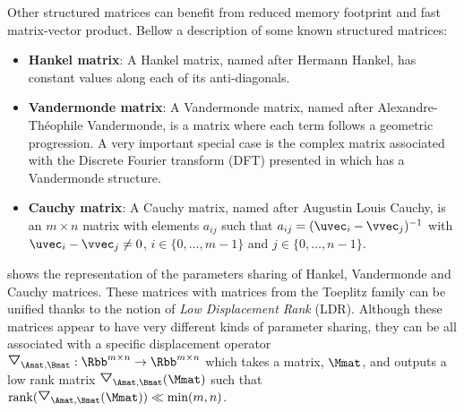 Other structured matrices can benefit from reduced memory footprint and fast matrix-vector product.
Bellow a description of some known structured matrices: 
\begin{itemize}
  \item \textbf{Hankel matrix}: A Hankel matrix, named after Hermann Hankel, has constant values along each of its anti-diagonals.
  \item \textbf{Vandermonde matrix}: A Vandermonde matrix, named after Alexandre-Théophile Vandermonde, is a matrix where each term follows a geometric progression.
    A very important special case is the complex matrix associated with the Discrete Fourier transform (DFT) presented in  which has a Vandermonde structure.
  \item \textbf{Cauchy matrix}: A Cauchy matrix, named after Augustin Louis Cauchy, is an $m \times n$ matrix with elements $a_{ij}$ such that $a_{ij} = (\uvec_i - \vvec_j)^{-1}$ with $\uvec_i - \vvec_j \neq 0$, $i \in \{0,\dots,m-1\}$ and $j \in \{0,\dots,n-1\}$.
\end{itemize}
 shows the representation of the parameters sharing of Hankel, Vandermonde and Cauchy matrices.
These matrices with matrices from the Toeplitz family can be unified thanks to the notion of \emph{Low Displacement Rank} (LDR).
Although these matrices appear to have very different kinds of parameter sharing, they can be all associated with a specific displacement operator $\triangleopdown_{\Amat, \Bmat}: \Rbb^{m \times n} \rightarrow \Rbb^{m \times n}$ which takes a matrix, $\Mmat$, and outputs a low rank matrix $\triangleopdown_{\Amat, \Bmat}(\Mmat)$ such that $\rank(\triangleopdown_{\Amat, \Bmat}(\Mmat)) \ll \min(m,n)$.


